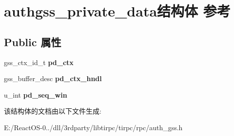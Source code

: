 \hypertarget{structauthgss__private__data}{}\section{authgss\+\_\+private\+\_\+data结构体 参考}
\label{structauthgss__private__data}
\subsection*{Public 属性}
\begin{DoxyCompactItemize}
\item 
\mbox{\label{structauthgss__private__data_aa0c6c91b1e34d113d7e2c6df3b985f3d}} 
gss\+\_\+ctx\+\_\+id\+\_\+t {\bfseries pd\+\_\+ctx}
\item 
\mbox{\label{structauthgss__private__data_a98a04155af6575d9d189c0f06285482b}} 
gss\+\_\+buffer\+\_\+desc {\bfseries pd\+\_\+ctx\+\_\+hndl}
\item 
\mbox{\label{structauthgss__private__data_afd8343999a86ada08ef86403f848ffa7}} 
u\+\_\+int {\bfseries pd\+\_\+seq\+\_\+win}
\end{DoxyCompactItemize}


该结构体的文档由以下文件生成\+:\begin{DoxyCompactItemize}
\item 
E\+:/\+React\+O\+S-\/0../dll/3rdparty/libtirpc/tirpc/rpc/auth\+\_\+gss.\+h\end{DoxyCompactItemize}
